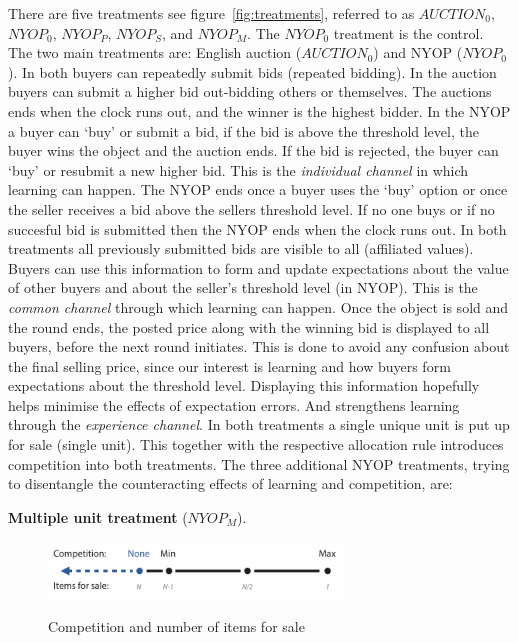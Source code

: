 \documentclass[a4paper,12pt]{article}
\begin{document}
	There are five treatments see figure~\ref{fig:treatments}, referred to as $AUCTION_0$, $NYOP_0$, $NYOP_P$, $NYOP_S$, and $NYOP_M$. The $NYOP_0$ treatment is the control. The two main treatments are: English auction ($AUCTION_0$) and NYOP ($NYOP_0$).
	In both buyers can repeatedly submit bids (repeated bidding). In the auction buyers can submit a higher bid out-bidding others or themselves. The auctions ends when the clock runs out, and the winner is the highest bidder. In the NYOP a buyer can `buy' or submit a bid, if the bid is above the threshold level, the buyer wins the object and the auction ends. If the bid is rejected, the buyer can `buy' or resubmit a new higher bid. This is the \emph{individual channel} in which learning can happen. The NYOP ends once a buyer uses the `buy' option or once the seller receives a bid above the sellers threshold level. If no one buys or if no succesful bid is submitted then the NYOP ends when the clock runs out. In both treatments all previously submitted bids are visible to all (affiliated values). Buyers can use this information to form and update expectations about the value of other buyers and about the seller's threshold level (in NYOP). This is the \emph{common channel} through which learning can happen. Once the object is sold and the round ends, the posted price along with the winning bid is displayed to all buyers, before the next round initiates. This is done to avoid any confusion about the final selling price, since our interest is learning and how buyers form expectations about the threshold level. Displaying this information hopefully helps minimise the effects of expectation errors. And strengthens learning through the \emph{experience channel}. In both treatments a single unique unit is put up for sale (single unit). This together with the respective allocation rule introduces competition into both treatments. The three additional NYOP treatments, trying to disentangle the counteracting effects of learning and competition, are:

	{\bf Multiple unit treatment} ($NYOP_M$). 
	
	\begin{figure}
	        \centering
	        \caption{Competition and number of items for sale}
	        \includegraphics[width=0.7\textwidth]{Figures/Competition-Items}
			\label{fig:competition-items}
	\end{figure}
	
\end{document}
